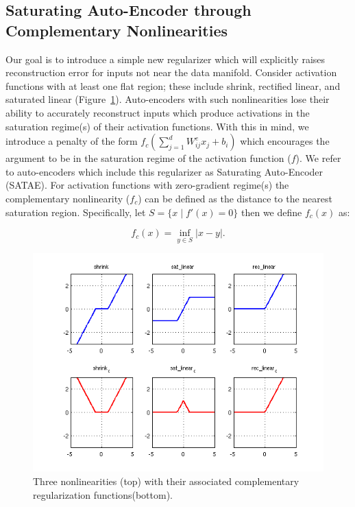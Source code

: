 \documentclass{article} %
\begin{document}
\subsection{Saturating Auto-Encoder through Complementary Nonlinearities}     
Our goal is to introduce a simple new regularizer which will explicitly raises reconstruction error for inputs not near the data manifold. Consider activation functions with at least one flat region; these include shrink, rectified linear, and saturated linear (Figure~\ref{fig:nonlin}). Auto-encoders with such nonlinearities lose their ability to accurately reconstruct inputs which produce activations in the saturation regime(s) of their activation functions. With this in mind, we introduce a penalty of the form $f_c(\sum_{j=1}^d W^e_{ij}x_j + b_i)$ which encourages the argument to be in the saturation regime of the activation function ($f$). We refer to auto-encoders which include this regularizer as Saturating Auto-Encoder (SATAE). For activation functions with zero-gradient regime(s) the complementary nonlinearity ($f_c$) can be defined as the distance to the nearest saturation region. Specifically, let $S = \{x \mid  f'(x) = 0\}$ then we define $f_c(x)$ as: 

\begin{equation}
f_c(x) = \inf_ {y \in S} |x-y|.   
\end{equation}   

\begin{figure}
\centering 
\includegraphics[scale=0.6]{./Figures/compliments.png}
\caption{Three nonlinearities (top) with their associated complementary regularization functions(bottom).}  
\label{fig:nonlin}
\end{figure} 
\end{document}
